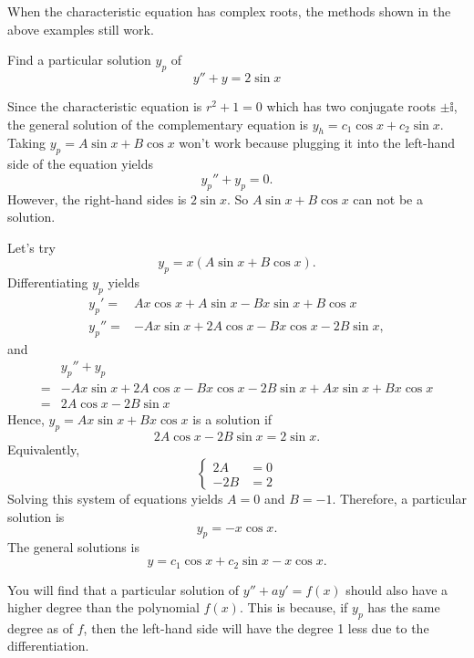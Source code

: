 When the characteristic equation has complex roots, the methods shown in the above examples still work.

\begin{example}
Find a particular solution $y_p$ of 
\[y'' + y = 2\sin x\]
\end{example}
\begin{solution}
Since the characteristic equation is $r^2+1=0$ which has two conjugate roots $\pm\mathbb{i}$, the general solution of the complementary equation is $y_h=c_1\cos x+c_2\sin x$.
Taking $y_p =A \sin x + B\cos x$ won't work because plugging it into the left-hand side of the equation yields
\[y_p'' +  y_p = 0.\]
However, the right-hand sides is $2\sin x$. So $A \sin x + B\cos x$ can not be a solution.

Let's try
\[y_p = x(A \sin x + B\cos x).\]
Differentiating $y_p$ yields
\[
\begin{aligned}
  y_p' = & Ax \cos x + A \sin x - Bx \sin x + B \cos x\\
  y_p''= & -A x \sin x + 2A \cos x - B x \cos x - 2B \sin x,
\end{aligned}  
\]
and 
\[
\begin{aligned} 
  & y_p'' +  y_p \\
=&  -A x \sin x + 2A \cos x - B x \cos x - 2B \sin x +  Ax \sin x + Bx\cos x\\
= &2A \cos x  -  2B \sin x
\end{aligned}
  \]
Hence, $y_p =  Ax \sin x + Bx\cos x$ is a solution if 
\[2A \cos x  -  2B \sin x  = 2\sin x.\]
Equivalently, 
\[
  \begin{cases}
	2A &=  0\\
	-2B&= 2 
\end{cases}
\]
Solving this system of equations yields $A=0$ and $B = -1$. 
Therefore, a particular solution is
\[y_p =  -x \cos x.\]
The general solutions is
\[y=c_1\cos x+c_2\sin x-x\cos x.\]
\end{solution}

You will find that a particular solution of $y''+ay'=f(x)$ should also have a higher degree than the polynomial $f(x)$. This is because, if $y_p$ has the same degree as of $f$, then the left-hand side will have the degree 1 less due to the differentiation.

